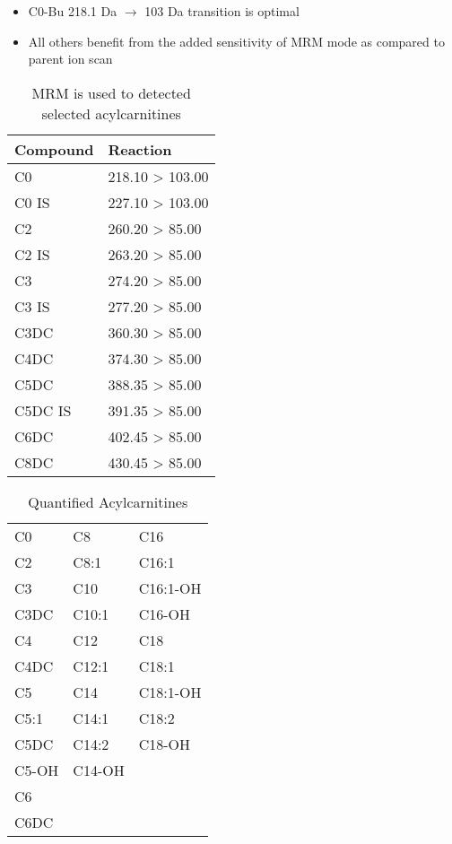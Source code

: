 \documentclass{scrartcl}
\begin{document}
\begin{enumerate}
\begin{itemize}
\item C0-Bu 218.1 Da \(\to\) 103 Da transition is optimal
\item All others benefit from the added sensitivity of MRM mode as compared to parent ion scan
\end{itemize}

\begin{table}[htbp]
\caption{\label{tab:org1f8282d}
MRM is used to detected selected acylcarnitines}
\centering
\begin{tabular}{ll}
Compound & Reaction\\
\hline
C0 & 218.10 > 103.00\\
C0 IS & 227.10 > 103.00\\
C2 & 260.20 > 85.00\\
C2 IS & 263.20 > 85.00\\
C3 & 274.20 > 85.00\\
C3 IS & 277.20 > 85.00\\
C3DC & 360.30 > 85.00\\
C4DC & 374.30 > 85.00\\
C5DC & 388.35 > 85.00\\
C5DC IS & 391.35 > 85.00\\
C6DC & 402.45 > 85.00\\
C8DC & 430.45 > 85.00\\
\end{tabular}
\end{table}

\begin{table}[htbp]
\caption{\label{tab:orgb91342b}
Quantified Acylcarnitines}
\centering
\begin{tabular}{lll}
C0 & C8 & C16\\
C2 & C8:1 & C16:1\\
C3 & C10 & C16:1-OH\\
C3DC & C10:1 & C16-OH\\
C4 & C12 & C18\\
C4DC & C12:1 & C18:1\\
C5 & C14 & C18:1-OH\\
C5:1 & C14:1 & C18:2\\
C5DC & C14:2 & C18-OH\\
C5-OH & C14-OH & \\
C6 &  & \\
C6DC &  & \\
\end{tabular}
\end{table}


\end{enumerate}
\end{document}
